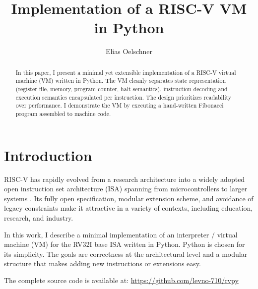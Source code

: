 \documentclass[sigconf]{acmart}
\begin{document}
\title{Implementation of a RISC-V VM in Python}

\author{Elias Oelschner}

\renewcommand{\shortauthors}{Oelschner}

\begin{abstract}
In this paper, I present a minimal yet extensible implementation of a RISC-V virtual machine (VM) written in Python. The VM cleanly separates state representation (register file, memory, program counter, halt semantics), instruction decoding and execution semantics encapsulated per instruction. The design prioritizes readability over performance. I demonstrate the VM by executing a hand-written Fibonacci program assembled to machine code.
\end{abstract}

\maketitle

\section{Introduction}
RISC-V has rapidly evolved from a research architecture into a widely adopted open instruction set architecture (ISA) spanning from microcontrollers to larger systems \cite{riscv-spec}. Its fully open specification, modular extension scheme, and avoidance of legacy constraints make it attractive in a variety of contexts, including education, research, and industry.

In this work, I describe a minimal implementation of an interpreter / virtual machine (VM) for the RV32I base ISA written in Python. Python is chosen for its simplicity. The goals are correctness at the architectural level and a modular structure that makes adding new instructions or extensions easy.

The complete source code is available at: \url{https://github.com/levno-710/rvpy}
\end{document}
